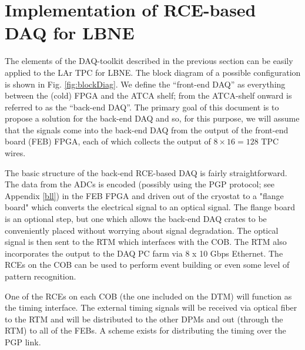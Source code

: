 \section{Implementation of RCE-based DAQ for LBNE}


The elements of the DAQ-toolkit described in the previous section can be easily applied to the LAr TPC for LBNE.  The block diagram of a possible configuration is shown in Fig. \ref{fig:blockDiag}.  We define the ``front-end DAQ'' as everything between the (cold) FPGA and the ATCA shelf; from the ATCA-shelf onward is referred to as the ``back-end DAQ''.    The primary goal of this document is to propose a solution for the back-end DAQ and so, for this purpose, we will assume that the signals come into the back-end DAQ from the output of the front-end board (FEB) FPGA, each of which collects the output of  $8\times 16 = 128$ TPC wires.  

The basic structure of the back-end RCE-based DAQ is fairly straightforward.  The data from the ADCs is encoded (possibly using the PGP protocol; see Appendix \ref{bll}) in the FEB FPGA and driven out of the cryostat to a "flange board" which converts the electrical signal to an optical signal.  The flange board is an optional step, but one which allows the back-end DAQ crates to be conveniently placed without worrying about signal degradation.   The optical signal is then sent to the RTM which interfaces with the COB.  The RTM also incorporates the output to the DAQ PC farm via 8 x 10 Gbps Ethernet.  The RCEs on the COB can be used to perform event building or even some level of pattern recognition.

One of the RCEs on each COB (the one included on the DTM) will function as the timing interface.  The  external timing  signals will be received via optical fiber to the RTM and will be distributed to the other DPMs and out (through the RTM) to all of the FEBs.  A scheme exists for distributing the timing over the PGP link.  




